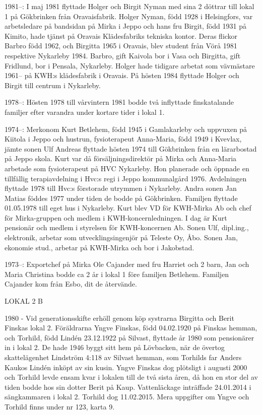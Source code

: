 1981--: I maj 1981 flyttade Holger och Birgit Nyman med sina 2 döttrar till lokal 1 på Gökbrinken från Oravaisfabrik. Holger Nyman, född 1928 i Helsingfors, var arbetsledare på bandsidan på Mirka i Jeppo och hans fru Birgit, född 1931 på Kimito, hade tjänst på Oravais Klädesfabriks tekniska kontor. Deras flickor Barbro född 1962, och Birgitta 1965 i Oravais, blev student från Vörå 1981 respektive Nykarleby 1984. Barbro, gift Kaivola bor i Vasa och Birgitta, gift Fridlund, bor i Pensala, Nykarleby. Holger hade tidigare arbetat som vävmästare 1961-- på KWH:s klädesfabrik i Oravais. På hösten 1984 flyttade Holger och Birgit till centrum i Nykarleby.

1978--: Hösten 1978 till vårvintern 1981 bodde två inflyttade finskatalande familjer efter varandra under kortare tider i lokal 1.

1974--: Merkonom Kurt Betlehem, född 1945 i Gamlakarleby och uppvuxen på Kiitola i Jeppo och hustrun, fysioterapeut Anna-Maria, född 1949 i Kvevlax, jämte sonen Ulf Andreas flyttade hösten 1974 till Gökbrinken från en lärarbostad på Jeppo skola. Kurt var då försäljningsdirektör på Mirka och Anna-Maria arbetade som fysioterapeut på HVC Nykarleby. Hon planerade och öppnade en tillfällig terapiavdelning i Hvc:s regi i Jeppo kommunalgård 1976. Avdelningen flyttade 1978 till Hvc:s förstorade utrymmen i Nykarleby. Andra sonen Jan Matias föddes 1977 under tiden de bodde på Gökbrinken.  Familjen flyttade 01.05.1978 till eget hus i Nykarleby. Kurt blev VD för KWH-Mirka Ab och chef för Mirka-gruppen och medlem i KWH-koncernledningen. I dag är Kurt pensionär och medlem i styrelsen för KWH-koncernen Ab. Sonen Ulf, dipl.ing., elektronik, arbetar som utvecklingsingenjör på Teleste Oy, Åbo. Sonen Jan, ekonomie stud., arbetar på KWH-Mirka och bor i Jakobstad.

1973--: Exportchef på Mirka Ole Cajander med fru Harriet och 2 barn, Jan och Maria Christina bodde ca 2 år i lokal 1 före familjen Betlehem. Familjen Cajander kom från Esbo, dit de återvände.


LOKAL 2 B

 1980 -
Vid generationsskifte erhöll genom köp systrarna Birgitta och Berit Finskas lokal 2.  Föräldrarna Yngve Finskas, född 04.02.1920 på Finskas hemman, och Torhild, född Lindén 23.12.1922 på Silvast, flyttade år 1980 som pensionärer in i lokal 2. De hade 1946 byggt sitt hem på Lövbacken, när de övertog skattelägenhet Lindström 4:118 av Silvast hemman, som Torhilds far Anders Kaukos Lindén inköpt av sin kusin. Yngve Finskas dog plötsligt i augusti 2000 och Torhild levde ensam kvar i lokalen till de två sista åren, då hon en stor del av tiden bodde hos sin dotter Berit på Kaup. Vattenläckage inträffade 24.01.2014 i sängkammaren i lokal 2. Torhild dog 11.02.2015. Mera uppgifter om Yngve och Torhild finns under nr 123, karta 9.

